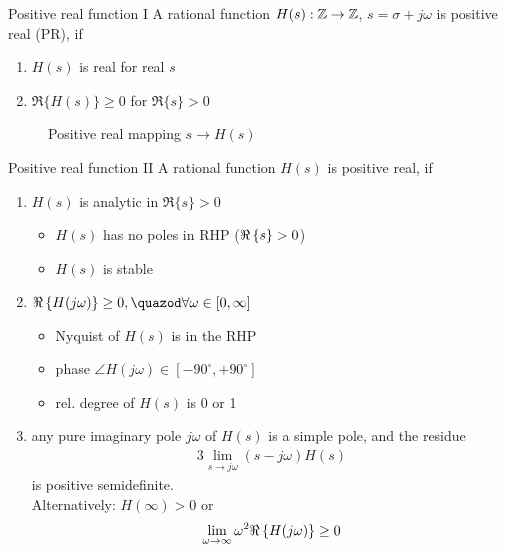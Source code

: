 \begin{definition}{Positive real function I}
A rational function $H(s): \mathbb{Z} \rightarrow \mathbb{Z}$, $s = \sigma + j\omega$ is
positive real (PR), if
\begin{enumerate}[label=(\roman*)]
\item {} $H(s)$ is real for real $s$ 
\item {} $\Re\{H(s)\} \geq 0$ for  $\Re\{s\} > 0$
\end{enumerate}

\begin{figure}[H]
    \centering
    \caption{Positive real mapping $s \rightarrow H(s)$}
    \label{fig:positive-real-mapping}
\end{figure}

\end{definition}

\begin{definition}{Positive real function II}
A rational function $H(s)$ is positive real, if
    \begin{enumerate}[label=(\roman*)]
    \item $H(s)$ is analytic
     in $\Re\{s\} >0$ 
        \begin{itemize}
        \item $H(s)$ has no poles in RHP ($\Re \left\lbrace s \right\rbrace > 0$)
        \item $H(s)$ is stable
        \end{itemize}
    \item $\Re \set{H(j\omega)} \geq 0, \quazod \forall\omega \in [0, \infty]$    
        \begin{itemize}
            \item Nyquist of $H(s)$ is in the RHP
            \item phase $\angle H(j\omega) \in [-90^{\circ}, +90^{\circ}]$
            \item rel. degree of $H(s)$ is 0 or 1
        \end{itemize}
    \item any pure imaginary pole $j\omega$ of $H(s)$ is
        a simple pole, and the residue
    \begin{alignat*}{3}
    \lim_{s \rightarrow j\omega} \left( s - j\omega \right) H(s)
    \end{alignat*}
        is positive semidefinite.\\

        Alternatively: $H(\infty) > 0$ or 
     \begin{alignat*}{3}
    \lim_{\omega \rightarrow \infty} \omega^2 \Re \left\lbrace H(j\omega) \right\rbrace \geq 0
    \end{alignat*}
    \end{enumerate}
\end{definition}~

